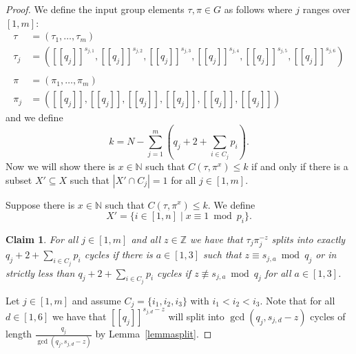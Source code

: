 \documentclass{article}
\newtheorem{claim}{Claim}
\newcommand{\llbracket}{[\![}
\newcommand{\rrbracket}{]\!]}
\begin{document}
\begin{proof}
We define the input group elements $\tau, \pi \in G$ as follows where $j$ ranges over $[1,m]$:
\begin{align*}
\tau &= (\tau_1,\dots,\tau_m)\\
\tau_j &= (\llbracket q_j \rrbracket^{s_{j,1}}, \llbracket q_j \rrbracket^{s_{j,2}}, \llbracket q_j \rrbracket^{s_{j,3}}, \llbracket q_j \rrbracket^{s_{j,4}}, \llbracket q_j \rrbracket^{s_{j,5}}, \llbracket q_j \rrbracket^{s_{j,6}})\\
&\\
\pi &= (\pi_1,\dots,\pi_m)\\
\pi_j &= (\llbracket q_j \rrbracket, \llbracket q_j \rrbracket, \llbracket q_j \rrbracket, \llbracket q_j \rrbracket, \llbracket q_j \rrbracket, \llbracket q_j \rrbracket)
\end{align*}
and we define
\begin{displaymath}
k = N - \sum_{j=1}^m (q_j + 2 + \sum_{i \in C_j} p_i).
\end{displaymath}
Now we will show there is $x \in \mathbb{N}$ such that $C(\tau,\pi^x) \leq k$ if and only if there is a subset $X' \subseteq X$ such that $|X' \cap C_j| = 1$ for all $j \in [1,m]$.

Suppose there is $x \in \mathbb{N}$ such that $C(\tau,\pi^x) \leq k$. We define
\begin{displaymath}
X' = \{i \in [1,n] \mid x \equiv 1 \bmod p_i\}.
\end{displaymath}
\begin{claim}\label{claimsplitupperboundcycles}
For all $j \in [1,m]$ and all $z \in \mathbb{Z}$ we have that $\tau_j\pi_j^{-z}$ splits into exactly $q_j + 2 + \sum_{i \in C_j} p_i$ cycles if there is $a \in [1,3]$ such that $z \equiv s_{j,a} \bmod q_j$ or in strictly less than $q_j + 2 + \sum_{i \in C_j} p_i$ cycles if $z \not \equiv s_{j,a} \bmod q_j$ for all $a \in [1,3]$.
\end{claim}
Let $j \in [1,m]$ and assume $C_j = \{i_1,i_2,i_3\}$ with $i_1 < i_2 < i_3$. Note that for all $d \in [1,6]$ we have that $\llbracket q_j \rrbracket^{s_{j,d}-z}$ will split into $\gcd(q_j,s_{j,d}-z)$ cycles of length $\frac{q_j}{\gcd(q_j,s_{j,d}-z)}$ by Lemma~\ref{lemmasplit}.


\end{proof}
\end{document}
